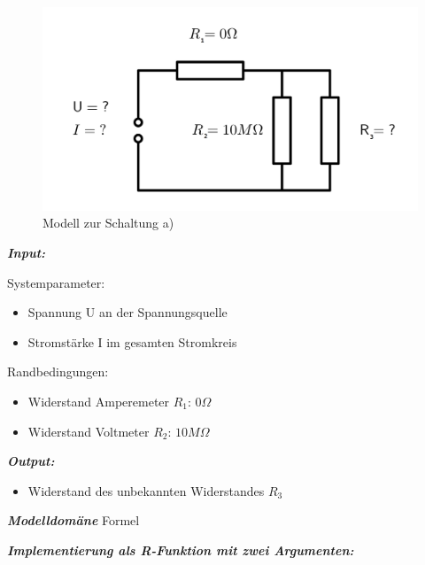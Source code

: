 \documentclass[
  9pt,
]{article}
\providecommand{\tightlist}{%
  \setlength{\itemsep}{0pt}\setlength{\parskip}{0pt}}
\begin{document}
\begin{figure}
\centering
\includegraphics[width=\textwidth,height=0.2\textheight]{Bilder/ModellA.png}
\caption{Modell zur Schaltung a)}
\end{figure}

\textbf{\emph{Input:}}

Systemparameter:

\begin{itemize}
\tightlist
\item
  Spannung U an der Spannungsquelle
\item
  Stromstärke I im gesamten Stromkreis
\end{itemize}

Randbedingungen:

\begin{itemize}
\tightlist
\item
  Widerstand Amperemeter \(R_1\): \(0\Omega\)
\item
  Widerstand Voltmeter \(R_2\): \(10M\Omega\)
\end{itemize}

\textbf{\emph{Output:}}

\begin{itemize}
\tightlist
\item
  Widerstand des unbekannten Widerstandes \(R_3\)
\end{itemize}

\textbf{\emph{Modelldomäne}} Formel

\newpage

\textbf{\emph{Implementierung als R-Funktion mit zwei Argumenten:}}
\end{document}
